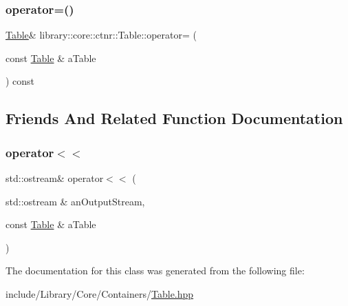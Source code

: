 \subsubsection{\texorpdfstring{operator=()}{operator=()}}
{\footnotesize\ttfamily \hyperlink{classlibrary_1_1core_1_1ctnr_1_1Table}{Table}\& library\+::core\+::ctnr\+::\+Table\+::operator= (\begin{DoxyParamCaption}\item[{const \hyperlink{classlibrary_1_1core_1_1ctnr_1_1Table}{Table} \&}]{a\+Table }\end{DoxyParamCaption}) const}



\subsection{Friends And Related Function Documentation}
\mbox{\label{classlibrary_1_1core_1_1ctnr_1_1Table_afaece709b2f143e4011941ae67b7adba}} 
\subsubsection{\texorpdfstring{operator$<$$<$}{operator<<}}
{\footnotesize\ttfamily std\+::ostream\& operator$<$$<$ (\begin{DoxyParamCaption}\item[{std\+::ostream \&}]{an\+Output\+Stream,  }\item[{const \hyperlink{classlibrary_1_1core_1_1ctnr_1_1Table}{Table} \&}]{a\+Table }\end{DoxyParamCaption})\hspace{0.3cm}{\ttfamily [friend]}}



The documentation for this class was generated from the following file\+:\begin{DoxyCompactItemize}
\item 
include/\+Library/\+Core/\+Containers/\hyperlink{Table_8hpp}{Table.\+hpp}\end{DoxyCompactItemize}
